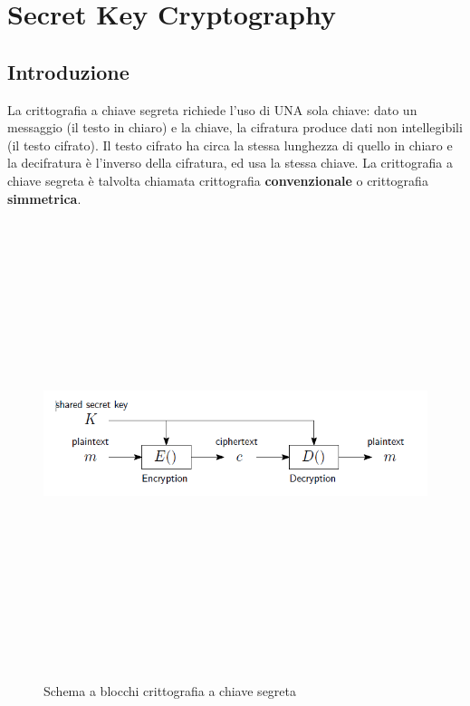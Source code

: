 \chapter{Secret Key Cryptography}

\section{Introduzione}
La crittografia a chiave segreta richiede l’uso di UNA sola chiave: dato un messaggio (il testo in chiaro) e la chiave, la cifratura produce
dati non intellegibili (il testo cifrato). Il testo cifrato ha circa la stessa lunghezza di quello in chiaro e la decifratura è l’inverso della cifratura, ed usa la stessa chiave. La crittografia a chiave segreta è talvolta chiamata crittografia \textbf{convenzionale} o crittografia \textbf{simmetrica}.
\begin{figure}[htbp]
	\centering%
	\subfigure%
	{\includegraphics[height=13cm, width=13cm, keepaspectratio]{Immagini/Capitolo2/segreta_schema_blocchi.png}}
	\caption{Schema a blocchi crittografia a chiave segreta \label{fig:segreta_schema_blocchi}} 	
\end{figure}

